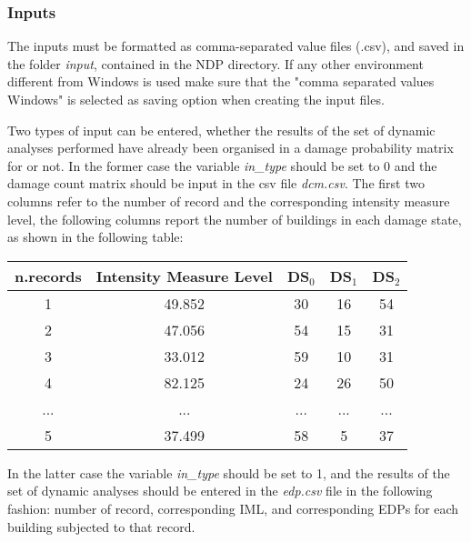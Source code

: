 \subsubsection{Inputs}
\label{subsubsec:NDMinputs}
The inputs must be formatted as comma-separated value files (.csv), and saved in the folder \textit{input}, contained in the NDP directory. If any other environment different from Windows is used make sure that the "comma separated values Windows" is selected as saving option when creating the input files.  

Two types of input can be entered, whether the results of the set of dynamic analyses performed have already been organised in a damage probability matrix for or not. In the former case the variable \textit{in\_type} should be set to 0 and the damage count matrix should be input in the csv file \textit{dcm.csv}. The first two columns refer to the number of record and the corresponding intensity measure level, the following columns report the number of buildings in each damage state, as shown in the following table:

\begin{table}[H]
\centering
\begin{tabular}{|c|c|c|c|c|} \hline
\textbf{n.records} & \textbf{Intensity Measure Level} & \textbf{DS$_0$} & \textbf{DS$_1$} & \textbf{DS$_2$} \\ \hline
1 & 49.852 &	30 &	16 &	54\\ \hline
2 & 47.056 &	54 &	15 &	31\\ \hline
3 & 33.012 &	59 &	10 &	31\\ \hline
4 & 82.125 &	24 &	26 &	50\\ \hline
... & ... & ... & ... & ... \\ \hline
5 & 37.499 &	58 &	5 &	37\\ \hline
\end{tabular}
\end{table}

In the latter case the variable \textit{in\_type} should be set to 1, and the results of the set of dynamic analyses should be entered in the \textit{edp.csv} file in the following fashion: number of record, corresponding IML, and corresponding EDPs for each building subjected to that record.

